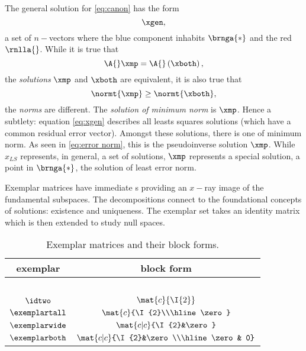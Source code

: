The general solution for \eqref{eq:canon} has the form
  \begin{equation}   %
      \xgen ,
  \label{eq:xgen}
  \end{equation}
a set of $n-$vectors where the blue component inhabits $\brnga{*}$ and the red $\rnlla{}$.
While it is true that 
  \begin{equation*}   %
    \A{} \xmp = \A{} \left( \xboth \right),
  \end{equation*}
the \emph{solutions} $\xmp$ and $\xboth$ are equivalent, it is also true that 
  \begin{equation}   %
      \normt{\xmp} \ge \normt{\xboth},
 \label{eq:error norm}
  \end{equation}
the \emph{norms} are different. The \emph{solution of minimum norm} is $\xmp$. Hence a subtlety: equation \eqref{eq:xgen} describes all leasts squares solutions (which have a common residual error vector). Amongst these solutions, there is one of minimum norm. As seen in \eqref{eq:error norm}, this is the pseudoinverse solution $\xmp$. While $x_{LS}$ represents, in general, a set of solutions, $\xmp$ represents a special solution, a point in $\brnga{*}$, the solution of least error norm.

Exemplar matrices have immediate \asvd s providing an $x-$ray image of the fundamental subspaces. The decompositions connect to the foundational concepts of solutions: existence and uniqueness. The exemplar set takes an identity matrix which is then extended to study null spaces.

  \begin{table}[htbp]  %
    \caption{Exemplar matrices and their block forms.}
    \begin{center}
      \begin{tabular}{cc}
        exemplar & block form \\\hline
        \ \\
        $\idtwo$ & $\mat{c}{\I{2}}$ \\[15pt]
        $\exemplartall$ & $\mat{c}{\I{2}\\\hline\zero}$ \\[20pt]
        $\exemplarwide$ & $\mat{c|c}{\I{2}&\zero}$ \\[15pt]
        $\exemplarboth$ & $\mat{c|c}{\I{2}&\zero\\\hline\zero & 0}$
      \end{tabular}
    \end{center}
  \end{table}%

